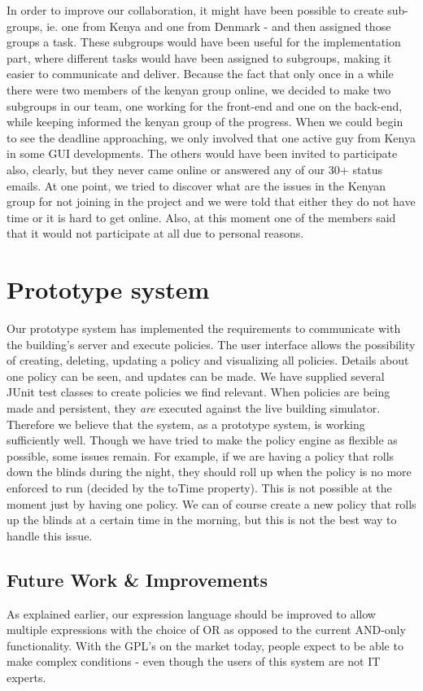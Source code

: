 In order to improve our collaboration, it might have been possible to create sub-groups, ie. one from Kenya and one from Denmark - and then assigned those groups a task. These subgroups would have been useful for the implementation part, where different tasks would have been assigned to subgroups, making it easier to communicate and deliver. Because the fact that only once in a while there were two members of the kenyan group online, we decided to make two subgroups in our team, one working for the front-end and one on the back-end, while keeping informed the kenyan group of the progress.  When we could begin to see the deadline approaching, we only involved that one active guy from Kenya in some GUI developments. The others would have been invited to participate also, clearly, but they never came online or answered any of our 30+ status emails. At one point, we tried to discover what are the issues in the Kenyan group for not joining in the project and we were told that either they do not have time or it is hard to get online. Also, at this moment one of the members said that it would not participate at all due to personal reasons. 

\section{Prototype system}\label{sec:product}
Our prototype system has implemented the requirements to communicate with the building's server and execute policies. The user interface allows the possibility of creating, deleting, updating a policy and visualizing all policies. Details about one policy can be seen, and updates can be made. 
We have supplied several JUnit test classes to create policies we find relevant. When policies are being made and persistent, they \textit{are} executed against the live building simulator. Therefore we believe that the system, as a prototype system, is working sufficiently well.
Though we have tried to make the policy engine as flexible as possible, some issues remain. For example, if we are having a policy that rolls down the blinds during the night, they should roll up when the policy is no more enforced to run (decided by the toTime property). This is not possible at the moment just by having one policy. We can of course create a new policy that rolls up the blinds at a certain time in the morning, but this is not the best way to handle this issue.

\subsection{Future Work \& Improvements}\label{subsec:improvements}
As explained earlier, our expression language should be improved to allow multiple expressions with the choice of OR as opposed to the current AND-only functionality. With the GPL's on the market today, people expect to be able to make complex conditions - even though the users of this system are not IT experts. 

